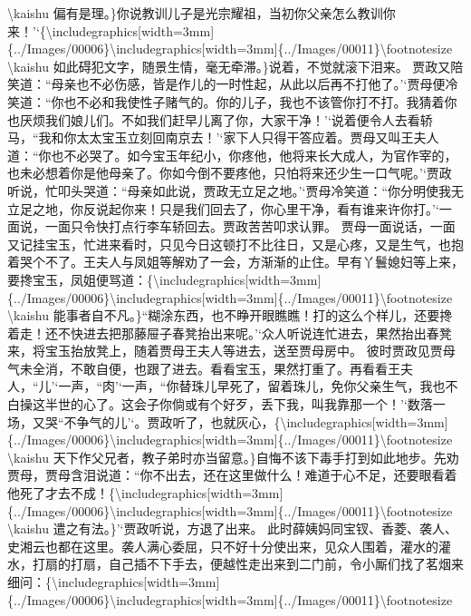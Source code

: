 \textbackslash{}kaishu
偏有是理。\}你说教训儿子是光宗耀祖，当初你父亲怎么教训你来！'`\{\textbackslash{}includegraphics{[}width=3mm{]}\{../Images/00006\}\textbackslash{}includegraphics{[}width=3mm{]}\{../Images/00011\}\textbackslash{}footnotesize
\textbackslash{}kaishu
如此碍犯文字，随景生情，毫无牵滞。\}说着，不觉就滚下泪来。
贾政又陪笑道：``母亲也不必伤感，皆是作儿的一时性起，从此以后再不打他了。'`贾母便冷笑道：``你也不必和我使性子赌气的。你的儿子，我也不该管你打不打。我猜着你也厌烦我们娘儿们。不如我们赶早儿离了你，大家干净！'`说着便令人去看轿马，``我和你太太宝玉立刻回南京去！'`家下人只得干答应着。贾母又叫王夫人道：``你也不必哭了。如今宝玉年纪小，你疼他，他将来长大成人，为官作宰的，也未必想着你是他母亲了。你如今倒不要疼他，只怕将来还少生一口气呢。'`贾政听说，忙叩头哭道：``母亲如此说，贾政无立足之地。'`贾母冷笑道：``你分明使我无立足之地，你反说起你来！只是我们回去了，你心里干净，看有谁来许你打。'`一面说，一面只令快打点行李车轿回去。贾政苦苦叩求认罪。
贾母一面说话，一面又记挂宝玉，忙进来看时，只见今日这顿打不比往日，又是心疼，又是生气，也抱着哭个不了。王夫人与凤姐等解劝了一会，方渐渐的止住。早有丫鬟媳妇等上来，要搀宝玉，凤姐便骂道：\{\textbackslash{}includegraphics{[}width=3mm{]}\{../Images/00006\}\textbackslash{}includegraphics{[}width=3mm{]}\{../Images/00011\}\textbackslash{}footnotesize
\textbackslash{}kaishu
能事者自不凡。\}``糊涂东西，也不睁开眼瞧瞧！打的这么个样儿，还要搀着走！还不快进去把那藤屉子春凳抬出来呢。'`众人听说连忙进去，果然抬出春凳来，将宝玉抬放凳上，随着贾母王夫人等进去，送至贾母房中。
彼时贾政见贾母气未全消，不敢自便，也跟了进去。看看宝玉，果然打重了。再看看王夫人，``儿'`一声，``肉'`一声，``你替珠儿早死了，留着珠儿，免你父亲生气，我也不白操这半世的心了。这会子你倘或有个好歹，丢下我，叫我靠那一个！'`数落一场，又哭``不争气的儿'`。贾政听了，也就灰心，\{\textbackslash{}includegraphics{[}width=3mm{]}\{../Images/00006\}\textbackslash{}includegraphics{[}width=3mm{]}\{../Images/00011\}\textbackslash{}footnotesize
\textbackslash{}kaishu
天下作父兄者，教子弟时亦当留意。\}自悔不该下毒手打到如此地步。先劝贾母，贾母含泪说道：``你不出去，还在这里做什么！难道于心不足，还要眼看着他死了才去不成！\{\textbackslash{}includegraphics{[}width=3mm{]}\{../Images/00006\}\textbackslash{}includegraphics{[}width=3mm{]}\{../Images/00011\}\textbackslash{}footnotesize
\textbackslash{}kaishu 遣之有法。\}'`贾政听说，方退了出来。
此时薛姨妈同宝钗、香菱、袭人、史湘云也都在这里。袭人满心委屈，只不好十分使出来，见众人围着，灌水的灌水，打扇的打扇，自己插不下手去，便越性走出来到二门前，令小厮们找了茗烟来细问：\{\textbackslash{}includegraphics{[}width=3mm{]}\{../Images/00006\}\textbackslash{}includegraphics{[}width=3mm{]}\{../Images/00011\}\textbackslash{}footnotesize
